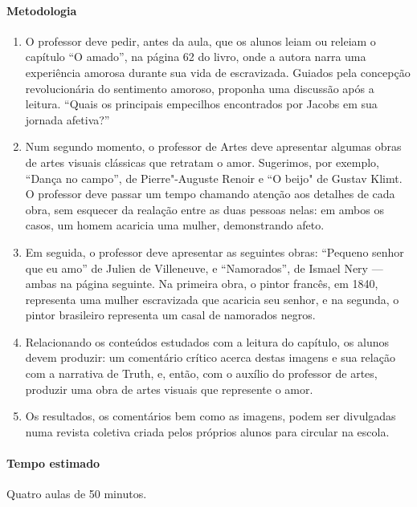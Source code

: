 \documentclass[11pt]{extarticle}
\begin{document}
 \paragraph{Metodologia}
   \begin{enumerate}
    \item
      O professor deve pedir, antes da aula, que os alunos leiam ou releiam 
      o capítulo ``O amado'', 
    na página 62 do livro, onde a autora narra uma experiência amorosa durante 
    sua vida de escravizada. Guiados pela concepção revolucionária do sentimento 
    amoroso, proponha uma discussão após a leitura. 
    ``Quais os principais empecilhos encontrados por Jacobs em sua jornada afetiva?''

    \item
    Num segundo momento, o professor de Artes deve apresentar algumas obras
    de artes visuais clássicas que retratam o amor. Sugerimos, por exemplo,
    ``Dança no campo'', de Pierre"-Auguste Renoir e ``O beijo" de Gustav Klimt.
    O professor deve passar um tempo chamando atenção aos detalhes de cada 
    obra, sem esquecer da realação entre as duas pessoas nelas: em ambos
    os casos, um homem acaricia uma mulher, demonstrando afeto.

    \item
    Em seguida, o professor deve apresentar as seguintes obras: 
    ``Pequeno senhor que eu amo'' de Julien de Villeneuve, e ``Namorados'',
    de Ismael Nery --- ambas na página seguinte. Na primeira obra, o pintor francês, em 1840, representa 
    uma mulher escravizada que acaricia seu senhor, e na segunda, o pintor 
    brasileiro representa um casal de namorados negros. 

    \item
    Relacionando os conteúdos estudados com a leitura do capítulo, 
    os alunos devem produzir: um comentário crítico acerca destas imagens 
    e sua relação com a narrativa de Truth, e, então, com o auxílio do
    professor de artes, produzir uma obra de artes visuais que represente o amor. 

    \item
    Os resultados, os comentários bem como as imagens, podem ser divulgadas
    numa revista coletiva criada pelos próprios alunos para circular na escola. 
\end{enumerate}

 \paragraph{Tempo estimado} Quatro aulas de 50 minutos.
\end{document}
